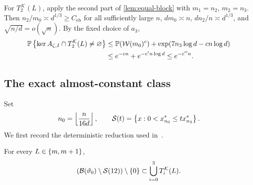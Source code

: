 For $T_2^{\mathcal K}(L)$, apply the second part of 
\cref{lem:equal-block} with $m_1=n_2$, $m_2=n_3$. Then $n_2/m_0\asymp d^{1/3}\ge C_{\mathrm{eb}}$ for all sufficiently large $n$, $dm_0\asymp n$, $dn_2/n\asymp d^{1/3}$, and $\sqrt{n/d}=o(\sqrt n)$. By the fixed choice of $a_3$,
\begin{align}
  \mathbb P\left\{\ker A_{\zeta,I}\cap T_2^{\mathcal K}(L)\ne\varnothing\right\}
  &\le\mathbb P(\mathcal W(m_0)^c)+\exp(7n_3\log d-cn\log d)\notag\\
  &\le e^{-cn}+e^{-c'n\log d}
  \le e^{-c''n}.
  \label{eq:T2-exclusion}
\end{align}

\subsection{The exact almost-constant class}\label{subsec:almost-constant}

Set
\begin{equation}\label{eq:n0-S-t}
  n_0=\left\lfloor \frac n{16d}\right\rfloor,
  \qquad
  \mathcal S(t)=\left\{x:0<x_{n_0}^*\le t x_{n_3}^*\right\}.
\end{equation}
We first record the deterministic reduction used in~\cite[Lemma~4.11]{LLTTY19}.

\begin{lemma}\label{lem:almost-constant-reduction}
For every $L\in\left\{m,m+1\right\}$,
\begin{equation}\label{eq:almost-constant-reduction}
  (\mathcal B(\vartheta_0)\setminus\mathcal S(12))\setminus\left\{0\right\}
  \subset\bigcup_{i=0}^3T_i^{\mathcal K}(L).
\end{equation}
\end{lemma}


